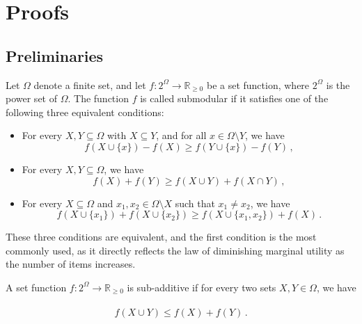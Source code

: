 \section{Proofs}

\subsection{Preliminaries}

\begin{definition}\label{thm:sub_def}
	Let $\Omega$ denote a finite set, and let $f: 2^{\Omega} \rightarrow \mathbb{R}_{\geq 0}$ be a set function, where $2^{\Omega}$ is the power set of $\Omega$. The function $f$ is called submodular if it satisfies one of the following three equivalent conditions:
	\begin{itemize}
		\item For every $X, Y \subseteq \Omega$ with $X \subseteq Y$, and for all $x \in \Omega \setminus Y$, we have 
			\begin{equation}
				f(X \cup \{x\}) - f(X) \geq f(Y \cup \{x\}) - f(Y) \,,
			\end{equation}
		\item For every $X, Y \subseteq \Omega$, we have 
			\begin{equation}\label{thm:sub_def_cond2}
				f(X) + f(Y) \geq f(X \cup Y) + f(X \cap Y) \,,
			\end{equation}
		\item For every $X \subseteq \Omega$ and $x_1, x_2 \in \Omega \setminus X$ such that $x_1 \neq x_2$, we have 
			\begin{equation}
				f(X \cup \{x_1\}) + f(X \cup \{x_2\}) \geq f(X \cup \{x_1, x_2\}) + f(X) \,.
			\end{equation}
	\end{itemize}
\end{definition}
These three conditions are equivalent, and the first condition is the most commonly used, as it directly reflects the law of diminishing marginal utility as the number of items increases.

\begin{definition}
	A set function $f: 2^{\Omega} \rightarrow \mathbb{R}_{\geq 0}$ is sub-additive if for every two sets $X, Y \in \Omega$, we have \
	\begin{equation}
		f(X\cup Y)\leq f(X) + f(Y)\,.
	\end{equation}
\end{definition}


